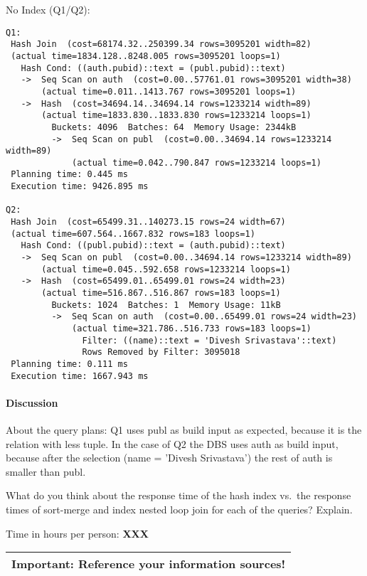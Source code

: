\documentclass[11pt]{scrartcl}
\begin{document}
\noindent No Index (Q1/Q2):
{\small
\begin{verbatim}
Q1:
 Hash Join  (cost=68174.32..250399.34 rows=3095201 width=82)
 (actual time=1834.128..8248.005 rows=3095201 loops=1)
   Hash Cond: ((auth.pubid)::text = (publ.pubid)::text)
   ->  Seq Scan on auth  (cost=0.00..57761.01 rows=3095201 width=38)
       (actual time=0.011..1413.767 rows=3095201 loops=1)
   ->  Hash  (cost=34694.14..34694.14 rows=1233214 width=89)
       (actual time=1833.830..1833.830 rows=1233214 loops=1)
         Buckets: 4096  Batches: 64  Memory Usage: 2344kB
         ->  Seq Scan on publ  (cost=0.00..34694.14 rows=1233214 width=89)
             (actual time=0.042..790.847 rows=1233214 loops=1)
 Planning time: 0.445 ms
 Execution time: 9426.895 ms

Q2:
 Hash Join  (cost=65499.31..140273.15 rows=24 width=67)
 (actual time=607.564..1667.832 rows=183 loops=1)
   Hash Cond: ((publ.pubid)::text = (auth.pubid)::text)
   ->  Seq Scan on publ  (cost=0.00..34694.14 rows=1233214 width=89)
       (actual time=0.045..592.658 rows=1233214 loops=1)
   ->  Hash  (cost=65499.01..65499.01 rows=24 width=23)
       (actual time=516.867..516.867 rows=183 loops=1)
         Buckets: 1024  Batches: 1  Memory Usage: 11kB
         ->  Seq Scan on auth  (cost=0.00..65499.01 rows=24 width=23)
             (actual time=321.786..516.733 rows=183 loops=1)
               Filter: ((name)::text = 'Divesh Srivastava'::text)
               Rows Removed by Filter: 3095018
 Planning time: 0.111 ms
 Execution time: 1667.943 ms

\end{verbatim}

}

\paragraph{Discussion}

About the query plans:
Q1 uses publ as build input as expected, because it is the relation with less tuple.
In the case of Q2 the DBS uses auth as build input, because after the selection (name = 'Divesh Srivastava') the rest of auth is smaller than publ.

What do you think about the response time of the hash index vs.\ the
response times of sort-merge and index nested loop join for each of
the queries? Explain.

\bigskip

\noindent Time in hours per person: {\bf XXX}

\bigskip

\begin{center}
  \begin{tabular}{c}
    \hline
    {\bf Important:} Reference your information sources!
    \\\hline
  \end{tabular}
\end{center}
\end{document}

